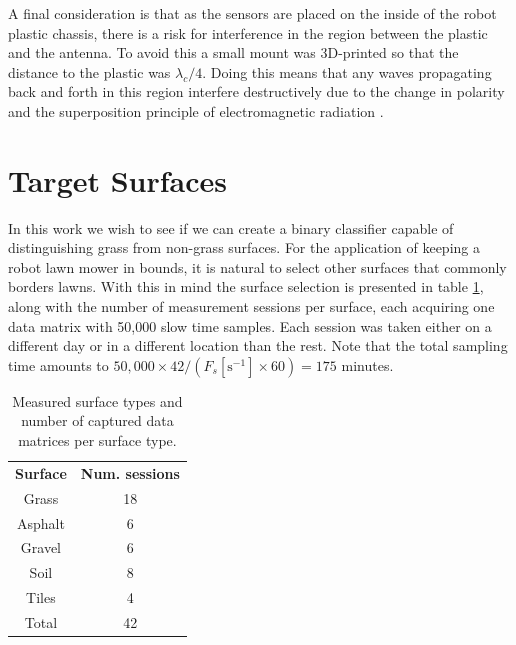 A final consideration is that as the sensors are placed on the inside of the robot plastic chassis, there is a risk for interference in the region between the plastic and the antenna. To avoid this a small mount was 3D-printed so that the distance to the plastic was $\lambda_c/4$. Doing this means that any waves propagating back and forth in this region interfere destructively due to the change in polarity and the superposition principle of electromagnetic radiation \citep{griffiths_2018}.

\section{Target Surfaces}

In this work we wish to see if we can create a binary classifier capable of distinguishing grass from non-grass surfaces. For the application of keeping a robot lawn mower in bounds, it is natural to select other surfaces that commonly borders lawns. With this in mind the surface selection is presented in table \ref{tab:count}, along with the number of measurement sessions per surface, each acquiring one data matrix with 50,000 slow time samples. Each session was taken either on a different day or in a different location than the rest. Note that the total sampling time amounts to $50,000\times42/(F_s [\text{s}^{-1}]\times60)=175$ minutes.

\begin{table}
\begin{center}
	\begin{tabular}{|c|c|}
		\hline
		\rowcolor{gray!150}\color{white}\textbf{Surface} & \color{white}\textbf{Num. sessions} \\
		 Grass & 18 \\
		 \rowcolor{gray!25} Asphalt & 6 \\
		 Gravel & 6 \\
		 \rowcolor{gray!25} Soil & 8 \\
		 Tiles & 4 \\ \hline
		 \rowcolor{gray!25} Total & 42 \\
		 \hline
	\end{tabular}
\end{center}
\caption{Measured surface types and number of captured data matrices per surface type.}
\label{tab:count}
\end{table}

